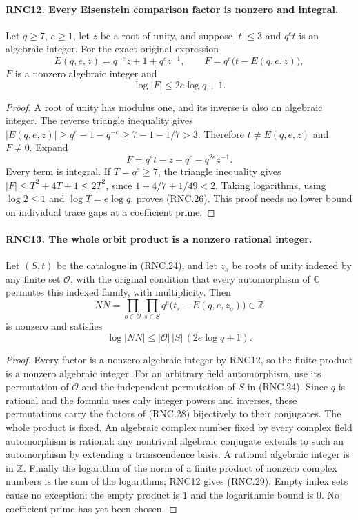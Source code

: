 \paragraph{RNC12. Every Eisenstein comparison factor is nonzero and integral.}
\label{claim:RNC12}
Let $q\geq7$, $e\geq1$, let $z$ be a root of unity,
and suppose $|t|\leq3$ and $q^e t$ is an algebraic integer.
For the exact original expression
\[
 E(q,e,z)=q^{-e}z+1+q^e z^{-1},\qquad
              F=q^e\bigl(t-E(q,e,z)\bigr),                    \tag{RNC.25}
\]
$F$ is a nonzero algebraic integer and
\[
                         \log|F|\leq2e\log q+1.
                                                               \tag{RNC.26}
\]
\begin{proof}
A root of unity has modulus one, and its inverse is also
an algebraic integer.  The reverse triangle inequality
gives
$|E(q,e,z)|\geq q^e-1-q^{-e}\geq7-1-1/7>3$.
Therefore $t\ne E(q,e,z)$ and $F\ne0$.
Expand
\[
             F=q^e t-z-q^e-q^{2e}z^{-1}.                      \tag{RNC.27}
\]
Every term is integral.  If $T=q^e\geq7$, the triangle
inequality gives
$|F|\leq T^2+4T+1\leq2T^2$, since
$1+4/7+1/49<2$.  Taking logarithms, using
$\log2\leq1$ and $\log T=e\log q$, proves (RNC.26).
This proof needs no lower bound on individual trace gaps
at a coefficient prime.
\end{proof}

\paragraph{RNC13. The whole orbit product is a nonzero rational integer.}
\label{claim:RNC13}
Let $(S,t)$ be the catalogue in (RNC.24), and let
$z_o$ be roots of unity indexed by any finite set $\mathcal O$,
with the original condition that every automorphism of
$\mathbb C$ permutes this indexed family, with multiplicity.
Then
\[
       NN=\prod_{o\in\mathcal O}\prod_{s\in S}
                   q^e\bigl(t_s-E(q,e,z_o)\bigr)\in\mathbb Z
                                                               \tag{RNC.28}
\]
is nonzero and satisfies
\[
      \log|NN|\leq |\mathcal O|\,|S|\,(2e\log q+1).
                                                               \tag{RNC.29}
\]
\begin{proof}
Every factor is a nonzero algebraic integer by RNC12, so
the finite product is a nonzero algebraic integer.  For
an arbitrary field automorphism, use its permutation of
$\mathcal O$ and the independent permutation of $S$ in
(RNC.24).  Since $q$ is rational and the formula uses only
integer powers and inverses, these permutations carry
the factors of (RNC.28) bijectively to their conjugates.
The whole product is fixed.  An algebraic complex number
fixed by every complex field automorphism is rational:
any nontrivial algebraic conjugate extends to such an
automorphism by extending a transcendence basis.  A
rational algebraic integer is in $\mathbb Z$.
Finally the logarithm of the norm of a finite product
of nonzero complex numbers is the sum of the logarithms;
RNC12 gives (RNC.29).  Empty index sets cause no exception:
the empty product is $1$ and the logarithmic bound is $0$.
No coefficient prime has yet been chosen.
\end{proof}

